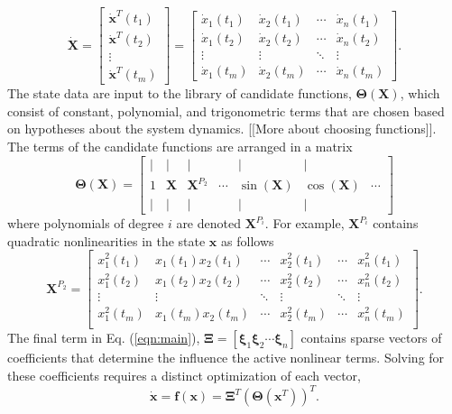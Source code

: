 \documentclass[12pt,preprintnumbers,amsmath,amssymb,titlepage]{report}
\newcommand{\refe}[1]{Eq. (\ref{#1})}
\begin{document}
\begin{equation*}
	\bm{\dot{X}} = \begin{bmatrix} 
				\bm{\dot{x}}^T(t_1) \\ \bm{\dot{x}}^T(t_2) \\ \vdots \\ \bm{\dot{x}}^T(t_m)
			\end{bmatrix}
		   = \begin{bmatrix}
		   		\dot{x}_1(t_1) & \dot{x}_2(t_1) & \cdots & \dot{x}_n(t_1) \\
		   		\dot{x}_1(t_2) & \dot{x}_2(t_2) & \cdots & \dot{x}_n(t_2) \\
		   		\vdots    	   & \vdots   		& \ddots & \vdots  \\
		   		\dot{x}_1(t_m) & \dot{x}_2(t_m) & \cdots & \dot{x}_n(t_m)
	   		\end{bmatrix}.
\end{equation*}
The state data are input to the library of candidate functions, $\bm{\Theta}(\bm{X})$, which consist of constant, polynomial, and trigonometric terms that are chosen based on hypotheses about the system dynamics. [[More about choosing functions]]. The terms of the candidate functions are arranged in a matrix 
\begin{equation}
	\bm{\Theta}(\bm{X}) = 
	\begin{bmatrix}
		\mid & \mid 	& \mid 	 		&        & \mid	  		& \mid 		   &  		\\
		1	 & \bm{X}   & \bm{X}^{P_2}  & \cdots & \sin(\bm{X}) & \cos(\bm{X}) & \cdots \\
		\mid & \mid 	& \mid 	 		&        & \mid	  		& \mid  	   &
	\end{bmatrix}
\end{equation}
where polynomials of degree $i$ are denoted $\bm{X}^{P_i}$. For example, $\bm{X}^{P_i}$ contains quadratic nonlinearities in the state $\bm{x}$ as follows
\begin{equation*}
	\bm{X}^{P_2} = 
		\begin{bmatrix}
			x_1^2(t_1)	&	x_1(t_1)x_2(t_1) & \cdots & x_2^2(t_1) & \cdots & x_n^2(t_1) \\
			x_1^2(t_2)	&	x_1(t_2)x_2(t_2) & \cdots & x_2^2(t_2) & \cdots & x_n^2(t_2) \\
			\vdots		&	\vdots		     & \ddots & \vdots	   & \ddots & \vdots	 \\
			x_1^2(t_m)	&	x_1(t_m)x_2(t_m) & \cdots & x_2^2(t_m) & \cdots & x_n^2(t_m) \\
		\end{bmatrix}.
\end{equation*}
The final term in \refe{eqn:main}, $\bm{\Xi} = [\bm{\xi}_1 \bm{\xi}_2 \cdots \bm{\xi}_n]$ contains sparse vectors of coefficients that determine the influence the active nonlinear terms. Solving for these coefficients requires a distinct optimization of each vector,
\begin{equation}
	\bm{\dot{x}} = \bm{f}(\bm{x}) = \bm{\Xi}^T(\bm{\Theta}(\bm{x}^T))^T.
\end{equation}
\end{document}

